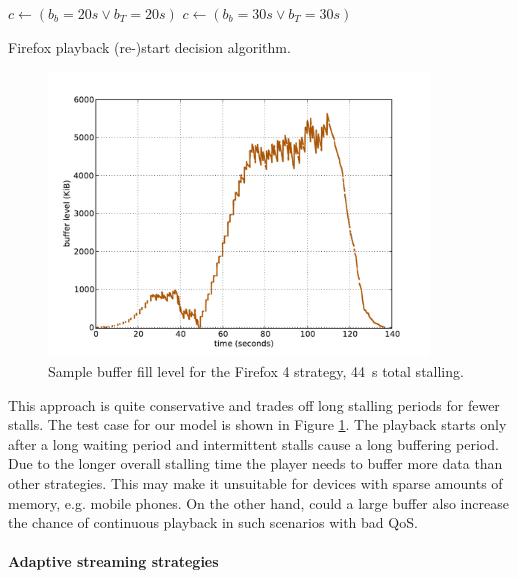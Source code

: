 \begin{algorithm}[htb]
    \centering
    \begin{algorithmic}
          \STATE $c \gets ( b_b=20s \lor b_T=20s )$
        \ELSE
          \STATE $c \gets ( b_b=30s \lor b_T=30s )$
        \ENDIF 
    \end{algorithmic}
    \caption{Firefox playback (re-)start decision algorithm.}
    \label{c3:alg:firefox}
\end{algorithm}

 \begin{figure}[htb]
    \centering
    \includegraphics[width=0.9\textwidth]{images/bufferlevel-firefox-new.pdf}
    \caption{Sample buffer fill level for the Firefox 4 strategy, \SI{44}{\second} total stalling.}
    \label{c3:fig:bufferlevel-firefox}
\end{figure}


This approach is quite conservative and trades off long stalling periods for fewer stalls. The test case for our model is shown in Figure \ref{c3:fig:bufferlevel-firefox}. The playback starts only after a long waiting period and intermittent stalls cause a long buffering period. 
Due to the longer overall stalling time the player needs to buffer more data than other strategies. This may make it unsuitable for devices with sparse amounts of memory, e.g. mobile phones. On the other hand, could a large buffer also increase the chance of continuous playback in such scenarios with bad \gls{QoS}.


\paragraph{Adaptive streaming strategies}

